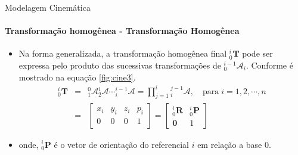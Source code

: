 \documentclass[aspectratio=169]{beamer}
\begin{document}
\begin{frame}{Modelagem Cinemática}
    \framesubtitle{Transformação homogênea - Transformação Homogênea}
    \begin{itemize}
        \item Na forma generalizada, a transformação homogênea final ${}^{i}_0\mathbf{T}$ pode ser expressa pelo produto das sucessivas transformações de ${}^{i-1}_0\mathcal{A}_i$. Conforme é mostrado na equação \eqref{fig:cine3}.
              \begin{equation}\label{fig:cine3}
                  \begin{array}{lcl}
                      {}^i_0\mathbf{T} & = & {}^0_1\mathcal{A}{}^1_2\mathcal{A} \cdots {}^{i-1}_i\mathcal{A} = \prod \limits^i_{j=1}{}^{j-1}_i\mathcal{A}, \quad \mathrm{para\;}i=1,2,\cdots,n \\[.2cm]
                                       & = &
                      \begin{bmatrix}
                          x_i & y_i & z_i & p_i \\
                          0   & 0   & 0   & 1
                      \end{bmatrix} =
                      \begin{bmatrix}
                          {}^i_0\mathbf{R} & {}^i_0\mathbf{P} \\
                          \mathbf{0}       & 1
                      \end{bmatrix}
                  \end{array}
              \end{equation}
        \item onde, ${}^i_0\mathbf{P}$ é o vetor de orientação do referencial $i$ em relação a base $0$.
    \end{itemize}

\end{frame}
\end{document}
